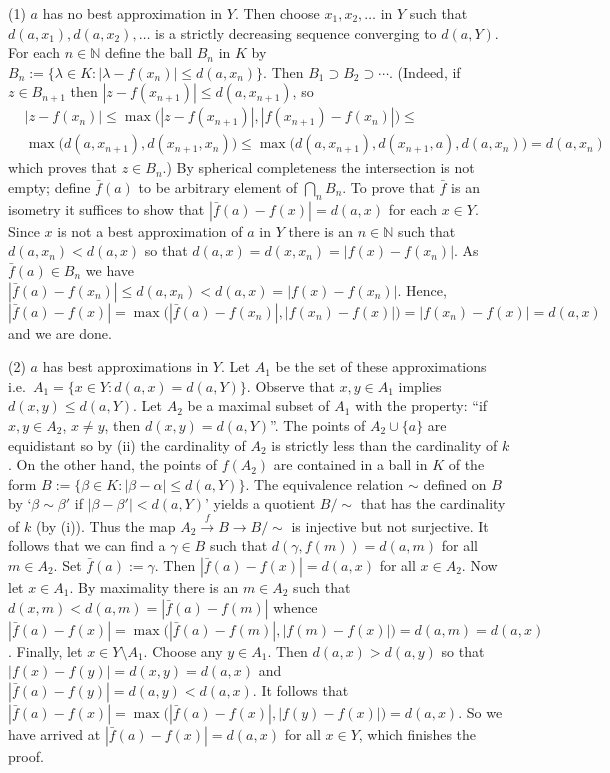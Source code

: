 \documentclass[11pt,a4paper,twoside]{article}
\begin{document}
(1) $a$ has no best approximation in $Y$. Then choose $x_1,x_2,\ldots$ in $Y$ such that $d(a,x_1),\allowbreak d(a,x_2),\allowbreak\ldots$ is a strictly decreasing sequence converging to $d(a,Y)$. For each $n\in\mathbb N$ define the ball $B_n$ in $K$ by $B_n:=\{\lambda\in K:|\lambda-f(x_n)|\leq d(a,x_n)\}$. Then $B_1\supset B_2\supset\cdots$. (Indeed, if $z\in B_{n+1}$ then $|z-f(x_{n+1})|\leq d(a,x_{n+1})$, so
\[
\begin{aligned}
&|z-f(x_n)|\leq\max\bigl(|z-f(x_{n+1})|,|f(x_{n+1})-f(x_n)|\bigr)\leq\\
&\max\bigl(d(a,x_{n+1}),d(x_{n+1},x_n)\bigr)\leq\max\bigl(d(a,x_{n+1}),d(x_{n+1},a),d(a,x_n)\bigr)=d(a,x_n)
\end{aligned}
\]
which proves that $z\in B_n$.) By spherical completeness the intersection is not empty; define $\bar f(a)$ to be arbitrary element of $\bigcap_n B_n$. To prove that $\bar f$ is an isometry it suffices to show that $|\bar f(a)-f(x)|=d(a,x)$ for each $x\in Y$. Since $x$ is not a best approximation of $a$ in $Y$ there is an $n\in\mathbb N$ such that $d(a,x_n)<d(a,x)$ so that $d(a,x)=d(x,x_n)=|f(x)-f(x_n)|$. As $\bar f(a)\in B_n$ we have $|\bar f(a)-f(x_n)|\leq d(a,x_n)<d(a,x)=|f(x)-f(x_n)|$. Hence,
\[
|\bar f(a)-f(x)|=\max\bigl(|\bar f(a)-f(x_n)|,|f(x_n)-f(x)|\bigr)=|f(x_n)-f(x)|=d(a,x)
\]
and we are done.

(2) $a$ has best approximations in $Y$. Let $A_1$ be the set of these approximations i.e.\ $A_1=\{x\in Y:d(a,x)=d(a,Y)\}$. Observe that $x,y\in A_1$ implies $d(x,y)\leq d(a,Y)$. Let $A_2$ be a maximal subset of $A_1$ with the property: ``if $x,y\in A_2$, $x\ne y$, then $d(x,y)=d(a,Y)$''. The points of $A_2\cup\{a\}$ are equidistant so by (ii) the cardinality of $A_2$ is strictly less than the cardinality of $k$. On the other hand, the points of $f(A_2)$ are contained in a ball in $K$ of the form $B:=\{\beta\in K:|\beta-\alpha|\leq d(a,Y)\}$. The equivalence relation $\sim$ defined on $B$ by `$\beta\sim\beta'$ if $|\beta-\beta'|<d(a,Y)$' yields a quotient $B/{\sim}$ that has the cardinality of $k$ (by (i)). Thus the map $A_2\xrightarrow{f}B\to B/{\sim}$ is injective but not surjective. It follows that we can find a $\gamma\in B$ such that $d(\gamma,f(m))=d(a,m)$ for all $m\in A_2$. Set $\bar f(a):=\gamma$. Then $|\bar f(a)-f(x)|=d(a,x)$ for all $x\in A_2$. Now let $x\in A_1$. By maximality there is an $m\in A_2$ such that $d(x,m)<d(a,m)=|\bar f(a)-f(m)|$ whence $|\bar f(a)-f(x)|=\max\bigl(|\bar f(a)-f(m)|,|f(m)-f(x)|\bigr)=d(a,m)=d(a,x)$. Finally, let $x\in Y\setminus A_1$. Choose any $y\in A_1$. Then $d(a,x)>d(a,y)$ so that $|f(x)-f(y)|=d(x,y)=d(a,x)$ and $|\bar f(a)-f(y)|=d(a,y)<d(a,x)$. It follows that $|\bar f(a)-f(x)|=\max\bigl(|\bar f(a)-f(x)|,|f(y)-f(x)|\bigr)=d(a,x)$. So we have arrived at $|\bar f(a)-f(x)|=d(a,x)$ for all $x\in Y$, which finishes the proof.
\end{document}
